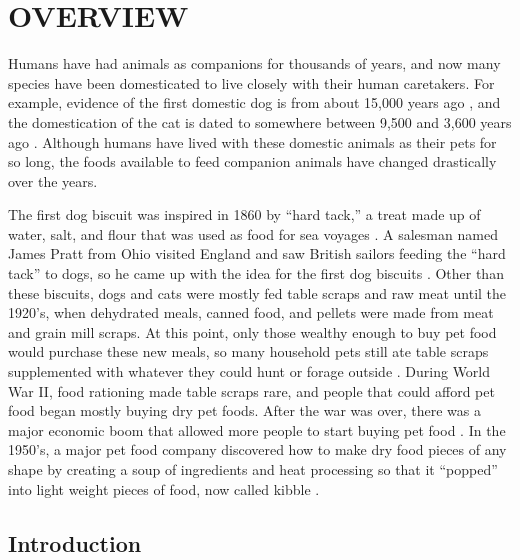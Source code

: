 \chapter{OVERVIEW}

Humans have had animals as companions for thousands of years, and now many species have been domesticated to live closely with their human caretakers. For example, evidence of the first domestic dog is from about 15,000 years ago \citep{savolainen}, and the domestication of the cat is dated to somewhere between 9,500 and 3,600 years ago \citep{driscoll}.  Although humans have lived with these domestic animals as their pets for so long, the foods available to feed companion animals have changed drastically over the years.
\par The first dog biscuit was inspired in 1860 by “hard tack,” a treat made up of water, salt, and flour that was used as food for sea voyages \citep{tudor}. A salesman named James Pratt from Ohio visited England and saw British sailors feeding the “hard tack” to dogs, so he came up with the idea for the first dog biscuits \citep{tudor}.  Other than these biscuits, dogs and cats were mostly fed table scraps and raw meat until the 1920’s, when dehydrated meals, canned food, and pellets were made from meat and grain mill scraps.  At this point, only those wealthy enough to buy pet food would purchase these new meals, so many household pets still ate table scraps supplemented with whatever they could hunt or forage outside \citep{tudor}.  During World War II, food rationing made table scraps rare, and people that could afford pet food began mostly buying dry pet foods.  After the war was over, there was a major economic boom that allowed more people to start buying pet food \citep{tudor}.  In the 1950’s, a major pet food company discovered how to make dry food pieces of any shape by creating a soup of ingredients and heat processing so that it “popped” into light weight pieces of food, now called kibble \citep{tudor}.


\section{Introduction}


